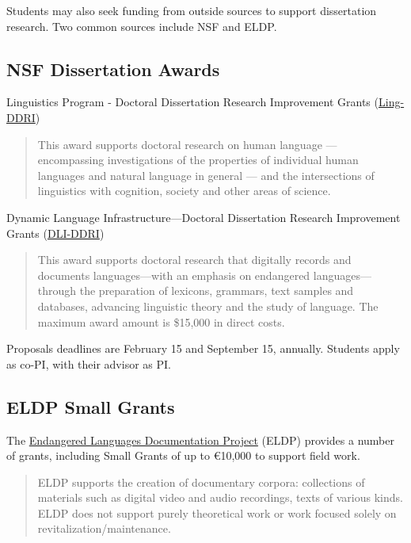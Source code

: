 \documentclass[
]{book}
\begin{document}
Students may also seek funding from outside sources to support dissertation research. Two common sources include NSF and ELDP.

\subsection{NSF Dissertation Awards}\label{nsf-dissertation-awards}

Linguistics Program - Doctoral Dissertation Research Improvement Grants (\href{https://new.nsf.gov/funding/opportunities/linguistics-program-doctoral-dissertation-research}{Ling-DDRI})

\begin{quote}
This award supports doctoral research on human language --- encompassing investigations of the properties of individual human languages and natural language in general --- and the intersections of linguistics with cognition, society and other areas of science.
\end{quote}

Dynamic Language Infrastructure---Doctoral Dissertation Research Improvement Grants (\href{https://new.nsf.gov/funding/opportunities/dynamic-language-infrastructure-doctoral}{DLI-DDRI})

\begin{quote}
This award supports doctoral research that digitally records and documents languages---with an emphasis on endangered languages---through the preparation of lexicons, grammars, text samples and databases, advancing linguistic theory and the study of language. The maximum award amount is \$15,000 in direct costs.
\end{quote}

Proposals deadlines are February 15 and September 15, annually. Students apply as co-PI, with their advisor as PI.

\subsection{ELDP Small Grants}\label{eldp-small-grants}

The \href{http://eldp.net}{Endangered Languages Documentation Project} (ELDP) provides a number of grants, including Small Grants of up to €10,000 to support field work.

\begin{quote}
ELDP supports the creation of documentary corpora: collections of materials such as digital video and audio recordings, texts of various kinds. ELDP does not support purely theoretical work or work focused solely on revitalization/maintenance.
\end{quote}
\end{document}
